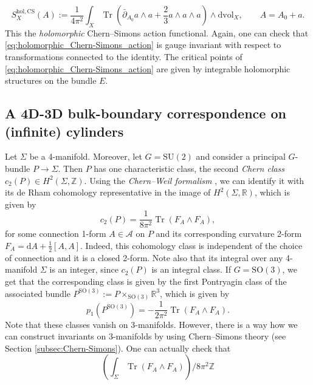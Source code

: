\documentclass[11pt,colorinlistoftodos]{amsart}
\numberwithin{equation}{subsection}
\theoremstyle{plain}
\theoremstyle{definition}
\theoremstyle{remark}
\newcommand{\R}{\mathbb{R}}
\newcommand{\Z}{\mathbb{Z}}
\newcommand{\dd}{{\mathrm{d}}}
\DeclareMathOperator{\tr}{Tr}
\newcommand{\de}{\partial}
\begin{document}
\begin{equation}
    \label{eq:holomorphic_Chern-Simons_action}
    S^{\mathrm{hol},\mathrm{CS}}_X(A):=\frac{1}{4\pi^2}\int_X\tr\left(\bar\de_{A_0}a\land a+\frac{2}{3}a\land a\land a\right)\land \dd\text{vol}_X,\qquad A=A_0+a.
\end{equation}
This the \emph{holomorphic} Chern--Simons action functional. Again, one can check that \eqref{eq:holomorphic_Chern-Simons_action} is gauge invariant with respect to transformations connected to the identity. The critical points of \eqref{eq:holomorphic_Chern-Simons_action} are given by integrable holomorphic structures on the bundle $E$.

\subsection{A 4D-3D bulk-boundary correspondence on (infinite) cylinders}
\label{subsec:4D-3D}
Let $\Sigma$ be a 4-manifold. Moreover, let $G=\mathrm{SU}(2)$ and consider a principal $G$-bundle $P\to \Sigma$. Then $P$ has one characteristic class, the second \emph{Chern class} $c_2(P)\in H^2(\Sigma,\Z)$. Using the \emph{Chern--Weil formalism} \cite{Weil1949,Chern1952}, we can identify it with its de Rham cohomology representative in the image of $H^2(\Sigma,\R)$, which is given by
\begin{equation}
    c_2(P)=\frac{1}{8\pi^2}\tr(F_A\land F_A),
\end{equation}
for some connection 1-form $A\in \mathcal{A}$ on $P$ and its corresponding curvature 2-form $F_A=\dd A+\frac{1}{2}[A,A]$. Indeed, this cohomology class is independent of the choice of connection and it is a closed 2-form. Note also that its integral over any 4-manifold $\Sigma$ is an integer, since $c_2(P)$ is an integral class.
If $G=\mathrm{SO}(3)$, we get that the corresponding class is given by the first Pontryagin class of the associated bundle $P^{\mathrm{SO}(3)}:=P\times_{\mathrm{SO}(3)}\R^3$, which is given by 
\begin{equation}
    p_1(P^{\mathrm{SO}(3)})=-\frac{1}{2\pi^2}\tr(F_A\land F_A).
\end{equation}
Note that these classes vanish on 3-manifolds. However, there is a way how we can construct invariants on 3-manifolds by using Chern--Simons theory (see Section \ref{subsec:Chern-Simons}). One can actually check that
\begin{equation}
\label{eq:Chern-Simons_inv}
    \left(\int_\Sigma\tr(F_A\land F_A)\right)\Big/8\pi^2\Z
\end{equation}
\end{document}
